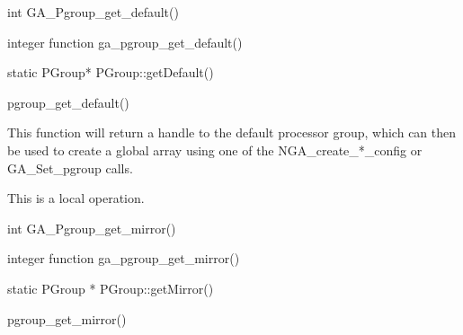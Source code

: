 \documentclass[12pt]{article}
\begin{document}
\begin{capi}
\begin{ccode}
int GA_Pgroup_get_default()
\end{ccode}
\end{capi}

\begin{fapi}
\begin{fcode}
integer function ga_pgroup_get_default()
\end{fcode}
\end{fapi}

\begin{cxxapi}
\begin{cxxcode}
static PGroup* PGroup::getDefault()
\end{cxxcode}
\end{cxxapi}

\begin{pyapi}
\begin{pycode}
pgroup_get_default()
\end{pycode}
\end{pyapi}

\local
\begin{desc}

This function will return a handle to the default processor group, which can then be used to create a global array using one of the NGA_create_*_config or GA_Set_pgroup calls.

This is a local operation.
\end{desc}


\begin{capi}
\begin{ccode}
int GA_Pgroup_get_mirror()
\end{ccode}
\end{capi}

\begin{fapi}
\begin{fcode}
integer function ga_pgroup_get_mirror()
\end{fcode}
\end{fapi}

\begin{cxxapi}
\begin{cxxcode}
static PGroup * PGroup::getMirror()
\end{cxxcode}
\end{cxxapi}

\begin{pyapi}
\begin{pycode}
pgroup_get_mirror()
\end{pycode}
\end{pyapi}
\end{document}
